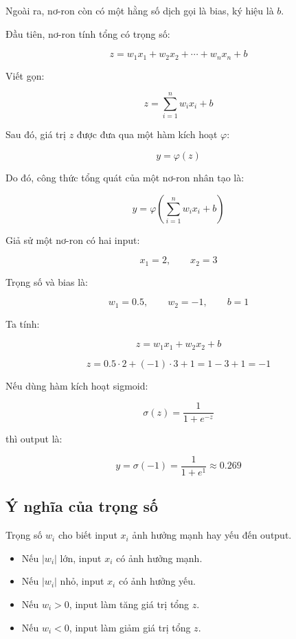 Ngoài ra, nơ-ron còn có một hằng số dịch gọi là bias, ký hiệu là $b$.

Đầu tiên, nơ-ron tính tổng có trọng số:

\[
    z = w_1x_1 + w_2x_2 + \cdots + w_nx_n + b
\]

Viết gọn:

\[
    z = \sum_{i=1}^{n} w_i x_i + b
\]

Sau đó, giá trị $z$ được đưa qua một hàm kích hoạt $\varphi$:

\[
    y = \varphi(z)
\]

Do đó, công thức tổng quát của một nơ-ron nhân tạo là:

\[
    y = \varphi\left(\sum_{i=1}^{n} w_i x_i + b\right)
\]

\begin{vidu}
Giả sử một nơ-ron có hai input:

\[
    x_1 = 2, \qquad x_2 = 3
\]

Trọng số và bias là:

\[
    w_1 = 0.5, \qquad w_2 = -1, \qquad b = 1
\]

Ta tính:

\[
    z = w_1x_1 + w_2x_2 + b
\]

\[
    z = 0.5 \cdot 2 + (-1)\cdot 3 + 1 = 1 - 3 + 1 = -1
\]

Nếu dùng hàm kích hoạt sigmoid:

\[
    \sigma(z) = \frac{1}{1+e^{-z}}
\]

thì output là:

\[
    y = \sigma(-1) = \frac{1}{1+e^1} \approx 0.269
\]
\end{vidu}

\subsection{Ý nghĩa của trọng số}

Trọng số $w_i$ cho biết input $x_i$ ảnh hưởng mạnh hay yếu đến output.

\begin{itemize}
    \item Nếu $|w_i|$ lớn, input $x_i$ có ảnh hưởng mạnh.
    \item Nếu $|w_i|$ nhỏ, input $x_i$ có ảnh hưởng yếu.
    \item Nếu $w_i > 0$, input làm tăng giá trị tổng $z$.
    \item Nếu $w_i < 0$, input làm giảm giá trị tổng $z$.
\end{itemize}

